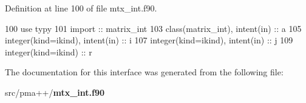 Definition at line 100 of file mtx\+\_\+int.\+f90.


\begin{DoxyCode}
100         \textcolor{keywordtype}{use }typy
101         \textcolor{keywordtype}{import }:: matrix\_int
103         \textcolor{keywordtype}{class}(matrix\_int), \textcolor{keywordtype}{intent(in)} :: a
105         \textcolor{keywordtype}{integer(kind=ikind)}, \textcolor{keywordtype}{intent(in)} :: i
107         \textcolor{keywordtype}{integer(kind=ikind)}, \textcolor{keywordtype}{intent(in)} :: j
109         \textcolor{keywordtype}{integer(kind=ikind)} :: r
\end{DoxyCode}


The documentation for this interface was generated from the following file\+:\begin{DoxyCompactItemize}
\item 
src/pma++/{\bf mtx\+\_\+int.\+f90}\end{DoxyCompactItemize}
